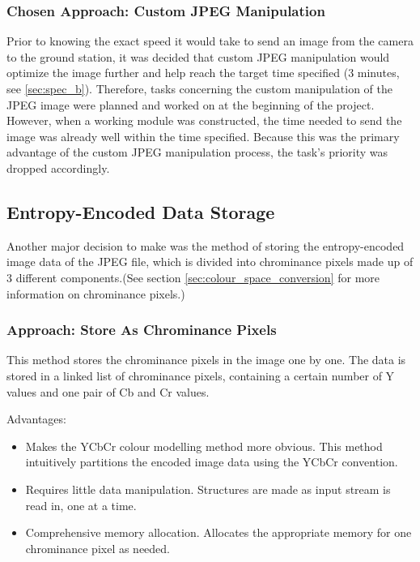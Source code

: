 \subsubsection{Chosen Approach: Custom JPEG Manipulation}

Prior to knowing the exact speed it would take to send 
an image from the camera to the ground station, 
it was decided that custom JPEG manipulation would optimize 
the image further and help reach the target time specified (3 minutes, see \ref{sec:spec_b}). 
Therefore, tasks concerning the custom manipulation of 
the JPEG image were planned and worked on 
at the beginning of the project. 
However, when a working module was constructed, the time needed to 
send the image was already well within the time specified. 
Because this was the primary advantage of the 
custom JPEG manipulation process, 
the task's priority was dropped accordingly.

\subsection{Entropy-Encoded Data Storage}

Another major decision to make was the method of 
storing the entropy-encoded image data of the JPEG file, 
which is divided into chrominance pixels made up of 
3 different components.(See section 
\ref{sec:colour_space_conversion} for
more information on chrominance pixels.)

\subsubsection{Approach: Store As Chrominance Pixels}

This method stores the chrominance pixels in 
the image one by one. 
The data is stored in a linked list of chrominance pixels, 
containing a certain number of Y values and 
one pair of Cb and Cr values.

Advantages:
\begin{itemize}
	\item Makes the YCbCr colour modelling method 
		more obvious. 
		This method intuitively partitions the 
		encoded image data using the YCbCr convention.
	\item Requires little data manipulation. 
		Structures are made as input stream is read in, 
		one at a time.
	\item Comprehensive memory allocation. 
		Allocates the appropriate memory for 
		one chrominance pixel as needed.
\end{itemize}


